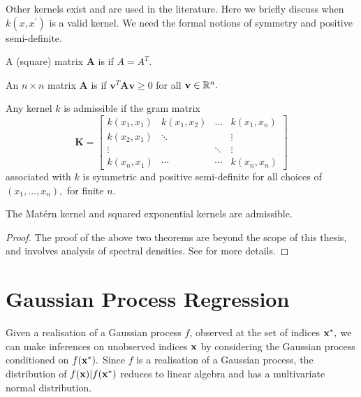 Other kernels exist and are used in the literature. Here we briefly discuss when
$k(x, x^\prime)$ is a valid kernel. We need the formal notions of symmetry and
positive semi-definite.

\begin{definition}[Symmetric]\label{def:sym_mat}
    A (square) matrix $\mathbf{A}$ is  if $A = A^T.$
\end{definition}

\begin{definition}\label{def:pos_def_mat}
    An $n\times n$ matrix $\mathbf{A}$ is  if
    $\mathbf{v}^T\mathbf{A}\mathbf{v} \geq 0$ for all $\mathbf{v}\in\mathbb{R}^n.$
\end{definition}

\begin{theorem}
    Any kernel $k$ is admissible if the gram matrix
    $$\mathbf{K} = \begin{bmatrix}
            k(x_1, x_1) & k(x_1, x_2) & \dots  & k(x_1, x_n) \\
            k(x_2, x_1) & \ddots      &        & \vdots      \\
            \vdots      &             & \ddots & \vdots      \\
            k(x_n, x_1) & \cdots      & \cdots & k(x_n, x_n)
        \end{bmatrix}$$ associated with $k$ is symmetric and positive
    semi-definite for all choices of $(x_1, \dots, x_n),$ for finite $n.$
\end{theorem}
\begin{theorem}
    The Mat\'ern kernel and squared exponential kernels are admissible.
\end{theorem}
\begin{proof}
    The proof of the above two theorems are beyond the scope of this thesis,
    and involves analysis of spectral densities.
    See \cite[chapter 4]{rasmussen_gaussian_2008} for more details.
\end{proof}

\section{Gaussian Process Regression}

Given a realisation of a Gaussian process $f$, observed at the set of indices
$\mathbf{x}^\ast,$ we can make inferences on unobserved indices $\mathbf{x}$ by considering the
Gaussian process conditioned on $f(\mathbf{x}^\ast).$
Since $f$ is a realisation of a Gaussian
process, the distribution of $f(\mathbf{x}) | f(\mathbf{x}^\ast)$ reduces to linear algebra
and has a multivariate normal distribution.

